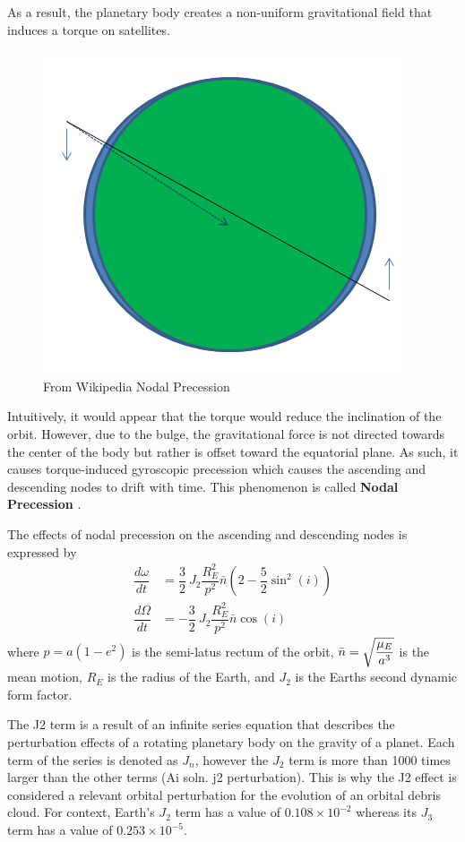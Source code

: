 \documentclass{article}
\newcommand{\boldindex}[1]{%
	\textbf{#1}\index{#1}%
}
\begin{document}
As a result, the planetary body creates a non-uniform gravitational field that induces a torque on satellites. 

\begin{figure}[h]
	\centering
	\includegraphics[scale=0.4]{Nodal_precession}
	\caption{From Wikipedia Nodal Precession}
\end{figure}

Intuitively, it would appear that the torque would reduce the inclination of the orbit. However, due to the bulge, the gravitational force is not directed towards the center of the body but rather is offset toward the equatorial plane. As such, it causes torque-induced gyroscopic precession which causes the ascending and descending nodes to drift with time. This phenomenon is called \boldindex{Nodal Precession}.

The effects of nodal precession on the ascending and descending nodes is expressed by
\begin{align*}
	\dfrac{d\omega}{dt} &= \dfrac{3}{2}\:J_2\dfrac{R_E^2}{p^2}\bar{n}(2 - \dfrac{5}{2}\sin^2(i))\\
	\dfrac{d\Omega}{dt} &= -\dfrac{3}{2}\:J_2\dfrac{R_E^2}{p^2}\bar{n}\cos(i)
\end{align*}
where $p = a(1 - e^2)$ is the semi-latus rectum of the orbit, $\bar{n}=\sqrt{\mathstrut\dfrac{\mu_E}{a^3}}$ is the mean motion, $R_E$ is the radius of the Earth, and $J_2$ is the Earths second dynamic form factor.

The J2 term is a result of an infinite series equation that describes the perturbation effects of a rotating planetary body on the gravity of a planet. Each term of the series is denoted as $J_n$, however the $J_2$ term is more than 1000 times larger than the other terms (Ai soln. j2 perturbation). This is why the J2 effect is considered a relevant orbital perturbation for the evolution of an orbital debris cloud. For context, Earth's  $J_2$ term has a value of $0.108 \times 10^{-2}$ whereas its $J_3$ term has a value of $0.253 \times 10^{-5}$.
\end{document}
